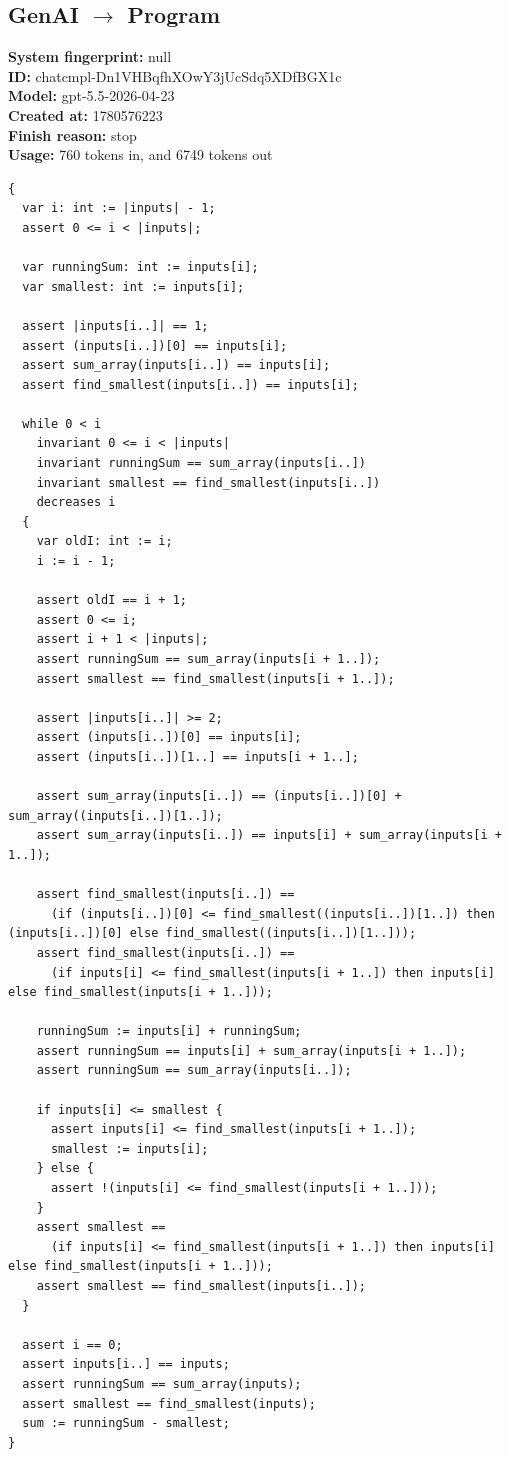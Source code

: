 \documentclass{article}
\begin{document}
\subsection*{GenAI $\rightarrow$ Program}
\textbf{System fingerprint: }null
\\\textbf{ID: }chatcmpl-Dn1VHBqfhXOwY3jUcSdq5XDfBGX1c
\\\textbf{Model: }gpt-5.5-2026-04-23
\\\textbf{Created at: }1780576223
\\\textbf{Finish reason: }stop
\\\textbf{Usage: }760 tokens in, and 6749 tokens out
\begin{lstlisting}
{
  var i: int := |inputs| - 1;
  assert 0 <= i < |inputs|;

  var runningSum: int := inputs[i];
  var smallest: int := inputs[i];

  assert |inputs[i..]| == 1;
  assert (inputs[i..])[0] == inputs[i];
  assert sum_array(inputs[i..]) == inputs[i];
  assert find_smallest(inputs[i..]) == inputs[i];

  while 0 < i
    invariant 0 <= i < |inputs|
    invariant runningSum == sum_array(inputs[i..])
    invariant smallest == find_smallest(inputs[i..])
    decreases i
  {
    var oldI: int := i;
    i := i - 1;

    assert oldI == i + 1;
    assert 0 <= i;
    assert i + 1 < |inputs|;
    assert runningSum == sum_array(inputs[i + 1..]);
    assert smallest == find_smallest(inputs[i + 1..]);

    assert |inputs[i..]| >= 2;
    assert (inputs[i..])[0] == inputs[i];
    assert (inputs[i..])[1..] == inputs[i + 1..];

    assert sum_array(inputs[i..]) == (inputs[i..])[0] + sum_array((inputs[i..])[1..]);
    assert sum_array(inputs[i..]) == inputs[i] + sum_array(inputs[i + 1..]);

    assert find_smallest(inputs[i..]) ==
      (if (inputs[i..])[0] <= find_smallest((inputs[i..])[1..]) then (inputs[i..])[0] else find_smallest((inputs[i..])[1..]));
    assert find_smallest(inputs[i..]) ==
      (if inputs[i] <= find_smallest(inputs[i + 1..]) then inputs[i] else find_smallest(inputs[i + 1..]));

    runningSum := inputs[i] + runningSum;
    assert runningSum == inputs[i] + sum_array(inputs[i + 1..]);
    assert runningSum == sum_array(inputs[i..]);

    if inputs[i] <= smallest {
      assert inputs[i] <= find_smallest(inputs[i + 1..]);
      smallest := inputs[i];
    } else {
      assert !(inputs[i] <= find_smallest(inputs[i + 1..]));
    }
    assert smallest ==
      (if inputs[i] <= find_smallest(inputs[i + 1..]) then inputs[i] else find_smallest(inputs[i + 1..]));
    assert smallest == find_smallest(inputs[i..]);
  }

  assert i == 0;
  assert inputs[i..] == inputs;
  assert runningSum == sum_array(inputs);
  assert smallest == find_smallest(inputs);
  sum := runningSum - smallest;
}
\end{lstlisting}
\end{document}

